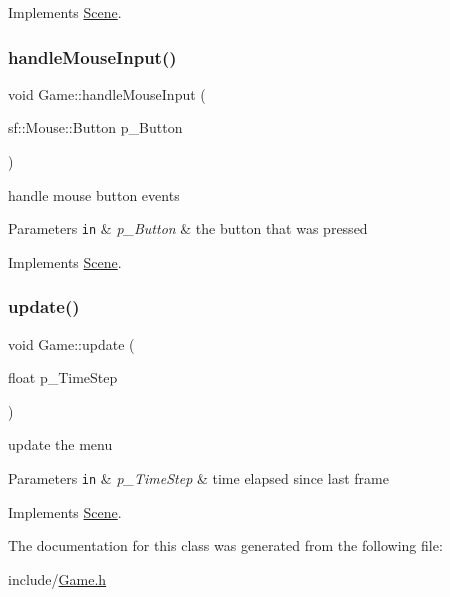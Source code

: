 Implements \hyperlink{class_scene_a182f90e2638c0da6a8ba2eab7cdc73ae}{Scene}.

\mbox{\label{class_game_a1c0ddbb7a468997249acbdd6cf2dbe34}} 
\subsubsection{\texorpdfstring{handle\+Mouse\+Input()}{handleMouseInput()}}
{\footnotesize\ttfamily void Game\+::handle\+Mouse\+Input (\begin{DoxyParamCaption}\item[{sf\+::\+Mouse\+::\+Button}]{p\+\_\+\+Button }\end{DoxyParamCaption})\hspace{0.3cm}{\ttfamily [virtual]}}

handle mouse button events 
\begin{DoxyParams}[1]{Parameters}
\mbox{\tt in}  & {\em p\+\_\+\+Button} & the button that was pressed \\
\hline
\end{DoxyParams}


Implements \hyperlink{class_scene_ad9240c92a58c4dba4c2409ec8bcff686}{Scene}.

\mbox{\label{class_game_a3fd12339411955db6a5445ba213ef293}} 
\subsubsection{\texorpdfstring{update()}{update()}}
{\footnotesize\ttfamily void Game\+::update (\begin{DoxyParamCaption}\item[{float}]{p\+\_\+\+Time\+Step }\end{DoxyParamCaption})\hspace{0.3cm}{\ttfamily [virtual]}}

update the menu 
\begin{DoxyParams}[1]{Parameters}
\mbox{\tt in}  & {\em p\+\_\+\+Time\+Step} & time elapsed since last frame \\
\hline
\end{DoxyParams}


Implements \hyperlink{class_scene_a461d21cd952c7dd0556850a3fc95a760}{Scene}.



The documentation for this class was generated from the following file\+:\begin{DoxyCompactItemize}
\item 
include/\hyperlink{_game_8h}{Game.\+h}\end{DoxyCompactItemize}
